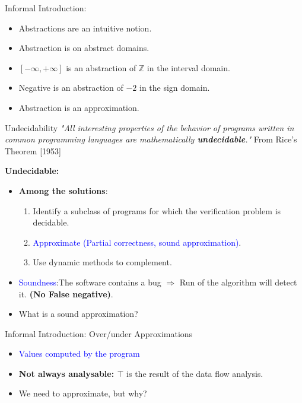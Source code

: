\begin{frame}{Informal Introduction:}
\begin{itemize}
	\item Abstractions are an intuitive notion.
	\item Abstraction is on abstract domains.
	\item $[-\infty, +\infty] $ is an abstraction of $\mathbb{Z}$ in the interval domain. 
	\item Negative is an abstraction of $-2$ in the sign domain.
	\item Abstraction is an approximation.
\end{itemize}
\end{frame}



\begin{frame}{Undecidability}
\textit{"All interesting properties of the behavior of programs written in common programming languages are mathematically \textbf{undecidable}."} From Rice's Theorem [1953]

\textbf{Undecidable:}
\begin{itemize}
	\item \textbf{Among the solutions}: 
	\begin{enumerate}
		\item Identify a subclass of programs for which the verification problem is decidable.
		\item \textcolor{blue}{Approximate (Partial correctness, sound approximation)}. 
		\item Use dynamic methods to complement.		
	\end{enumerate}
\item \textcolor{blue}{Soundness}:The software contains a bug $\Rightarrow$  Run of the algorithm will detect it. \textbf{(No False negative)}.
\item What is a sound approximation?
\end{itemize} 
\end{frame}


\begin{frame}{Informal Introduction: Over/under Approximations}
\centering
\begin{itemize}
	\item \textcolor{blue}{Values computed by the program}
	\item \textbf{Not always analysable: $\top$} is the result of the data flow analysis.
	\item We need to approximate, but why?

\end{itemize}
\end{frame}

